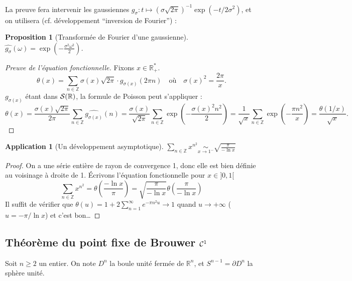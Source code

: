 \documentclass[a4paper, 11pt]{article}
\def\Z{\mathbb{Z}}
\def\R{\mathbb{R}}
\def\S{{\cal{S}}}
\def\Cf{{\cal{C}}}
\newtheorem*{proposition}{Proposition}
\newtheorem*{application}{Application}
\begin{document}
La preuve fera intervenir les gaussiennes $g_\sigma : t \mapsto
(\sigma\sqrt{2\pi})^{-1} \exp(-t/2\sigma^2)$, et on utilisera (cf. développement
\enquote{inversion de Fourier}) :
\begin{proposition}[Transformée de Fourier d'une gaussienne]
  $\displaystyle \widehat{g_\sigma}(\omega) = \exp\left(- \frac{\sigma^2
      \omega^2}{2} \right)$. %
\end{proposition}

\begin{proof}[Preuve de l'équation fonctionnelle]
  Fixons $x \in \R_+^*$.
  \[ \theta(x) = \sum_{n \in \Z} \sigma(x)\sqrt{2\pi}
    \cdot g_{\sigma(x)}(2\pi n) \quad \text{où} \quad
    \sigma(x)^2 = \frac{2\pi}{x}.
  \]
  $g_{\sigma(x)}$ étant dans $\S(\R)$, la formule de Poisson peut s'appliquer :
  \[ \theta(x) =
    \frac{\sigma(x)\sqrt{2\pi}}{2\pi} \sum_{n \in \Z}
    \widehat{g_{\sigma(x)}}(n) =
    \frac{\sigma(x)}{\sqrt{2\pi}} \sum_{n \in \Z}
    \exp\left(-\frac{\sigma(x)^2 n^2}{2} \right) =
    \frac{1}{\sqrt{x}} \sum_{n \in \Z} \exp\left( -\frac{\pi n^2}{x} \right)
    = \frac{\theta(1/x)}{\sqrt{x}}.
  \]
\end{proof}

\begin{application}[Un développement asymptotique]
  $\displaystyle \sum_{n \in \Z} x^{n^2} \underset{x \to 1^-}{\sim}
  \sqrt{\frac{\pi}{- \ln x}}$
\end{application}
\begin{proof}
  On a une série entière de rayon de convergence 1, donc elle est bien définie
  au voisinage à droite de 1. Écrivons l'équation fonctionnelle pour $x \in
  ]0,1[$
  \[ \sum_{n \in \Z} x^{n^2} = \theta\left( \frac{- \ln x}{\pi} \right) =
      \sqrt{\frac{\pi}{- \ln x}} \theta\left( \frac{\pi}{- \ln x} \right)
  \]
  Il suffit de vérifier que $\displaystyle \theta(u) = 1 + 2 \sum_{n=1}^\infty
  e^{-\pi n^2 u}\to 1$ quand $u \to +\infty$ ($u = -\pi/\ln x$) et c'est bon…
\end{proof}

\newpage

\subsection{Théorème du point fixe de Brouwer $\Cf^1$}

Soit $n \geq 2$ un entier. On note $D^n$ la boule unité fermée de $\R^n$, et
$S^{n-1} = \partial D^n$ la sphère unité.
\end{document}
